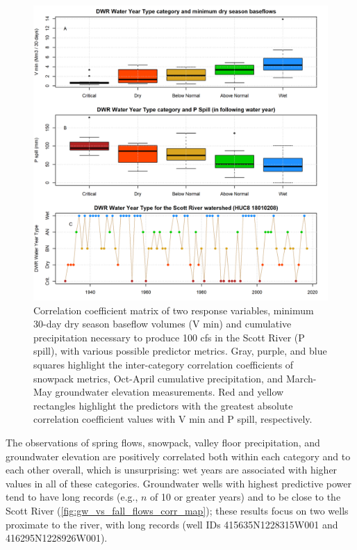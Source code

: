 \documentclass[hess, manuscript]{copernicus}
\begin{document}
\begin{figure}
\includegraphics[width=1\linewidth]{f07} \caption{\label{fig:corr_matrix} Correlation coefficient matrix of two response variables, minimum 30-day dry season baseflow volumes (V min) and cumulative precipitation necessary to produce 100 cfs in the Scott River (P spill), with various possible predictor metrics. Gray, purple, and blue squares highlight the inter-category correlation coefficients of snowpack metrics, Oct-April cumulative precipitation, and March-May groundwater elevation measurements. Red and yellow rectangles highlight the predictors with the greatest absolute correlation coefficient values with V min and P spill, respectively.}\label{fig:corr_matrix}
\end{figure}

The observations of spring flows, snowpack, valley floor precipitation,
and groundwater elevation are positively correlated both within each
category and to each other overall, which is unsurprising: wet years are
associated with higher values in all of these categories. Groundwater
wells with highest predictive power tend to have long records (e.g.,
\(n\) of 10 or greater years) and to be close to the Scott River
(\autoref{fig:gw_vs_fall_flows_corr_map}); these results focus on two
wells proximate to the river, with long records (well IDs
415635N1228315W001 and 416295N1228926W001).
\end{document}
